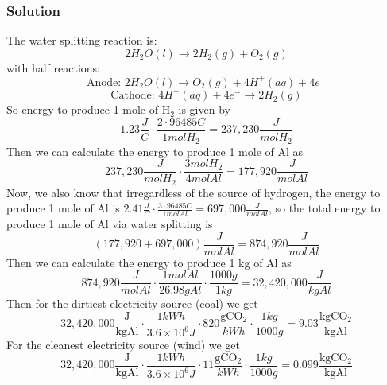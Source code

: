 \documentclass[12pt]{article}
\begin{document}
\subsubsection{Solution}
The water splitting reaction is:
\begin{equation}
2 H_{2}O(l) \rightarrow 2 H_{2}(g) + O_{2}(g)
\end{equation}
with half reactions:
\begin{equation}
\text{Anode: } 2 H_{2}O(l) \rightarrow O_{2}(g) + 4 H^{+}(aq) + 4 e^{-}
\end{equation}
\begin{equation}
\text{Cathode: } 4 H^{+}(aq) + 4 e^{-} \rightarrow 2 H_{2}(g)
\end{equation}
So energy to produce 1 mole of $\mathrm{H}_{2}$ is given by
\begin{equation}1.23 \frac{J}{C}\cdot \frac{2 \cdot 96485 C}{1 mol H_{2}} = 237,230 \frac{J}{mol H_{2}}
\end{equation}
Then we can calculate the energy to produce 1 mole of Al as
\begin{equation}237,230 \frac{J}{mol H_{2}} \cdot \frac{3 mol H_{2}}{4 mol Al} = 177,920 \frac{J}{mol Al}
\end{equation}
Now, we also know that irregardless of the source of hydrogen, the energy to produce 1 mole of Al is $2.41 \frac{J}{C} \cdot \frac{3 \cdot 96485 C}{1 mol Al} = 697,000 \frac{J}{mol Al}$, so the total energy to produce 1 mole of Al via water splitting is
\begin{equation}(177,920 + 697,000) \frac{J}{mol Al} = 874,920 \frac{J}{mol Al}
\end{equation}
Then we can calculate the energy to produce 1 kg of Al as
\begin{equation}874,920 \frac{J}{mol Al} \cdot \frac{1 mol Al}{26.98 g Al} \cdot \frac{1000 g}{1 kg} = 32,420,000 \frac{J}{kg Al}
\end{equation}
Then for the dirtiest electricity source (coal) we get
\begin{equation}    32,420,000 \frac{\mathrm{J}}{\mathrm{kg} \mathrm{Al}} \cdot \frac{1 kWh}{3.6 \times 10^{6} J} \cdot 820 \frac{\mathrm{g} \mathrm{CO}_{2}}{kWh} \cdot \frac{1 kg}{1000 g} = 9.03 \frac{\mathrm{kg} \mathrm{CO}_{2}}{\mathrm{kg} \mathrm{Al}}
\end{equation}
For the cleanest electricity source (wind) we get
\begin{equation}    32,420,000 \frac{\mathrm{J}}{\mathrm{kg} \mathrm{Al}} \cdot \frac{1 kWh}{3.6 \times 10^{6} J} \cdot 11 \frac{\mathrm{g} \mathrm{CO}_{2}}{kWh} \cdot \frac{1 kg}{1000 g} = 0.099 \frac{\mathrm{kg} \mathrm{CO}_{2}}{\mathrm{kg} \mathrm{Al}}
\end{equation}
\end{document}
